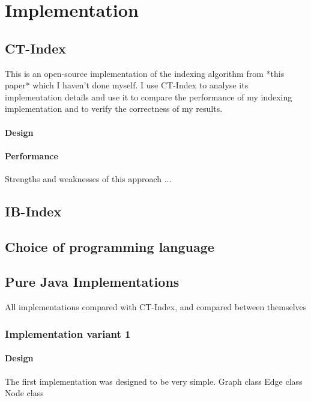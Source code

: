 \documentclass{l4proj}
\theoremstyle{definition}
\begin{document}
\chapter{Implementation}
    \section{CT-Index}
    
    This is an open-source implementation of the indexing algorithm from *this paper* which I haven't done myself. I use CT-Index to analyse its implementation details and use it to compare the performance of my indexing implementation and to verify the correctness of my results.
    
    \subsubsection{Design}
    
    \subsubsection{Performance}
    
    Strengths and weaknesses of this approach ...
    
    \section{IB-Index}
    \section{Choice of programming language}
    \section{Pure Java Implementations}
    
    All implementations compared with CT-Index, and compared between themselves
    
        \subsection{Implementation variant 1}
            \subsubsection{Design}
            The first implementation was designed to be very simple.
            Graph class
            Edge class
            Node class
            
\end{document}
